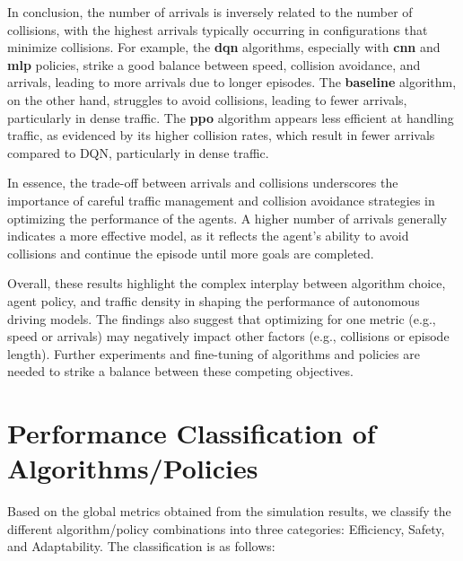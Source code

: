 In conclusion, the number of arrivals is inversely related to the number of collisions, with the highest arrivals typically occurring in configurations that minimize collisions. For example, the \textbf{dqn} algorithms, especially with \textbf{cnn} and \textbf{mlp} policies, strike a good balance between speed, collision avoidance, and arrivals, leading to more arrivals due to longer episodes. The \textbf{baseline} algorithm, on the other hand, struggles to avoid collisions, leading to fewer arrivals, particularly in dense traffic. The \textbf{ppo} algorithm appears less efficient at handling traffic, as evidenced by its higher collision rates, which result in fewer arrivals compared to DQN, particularly in dense traffic.

In essence, the trade-off between arrivals and collisions underscores the importance of careful traffic management and collision avoidance strategies in optimizing the performance of the agents. A higher number of arrivals generally indicates a more effective model, as it reflects the agent's ability to avoid collisions and continue the episode until more goals are completed.

Overall, these results highlight the complex interplay between algorithm choice, agent policy, and traffic density in shaping the performance of autonomous driving models. The findings also suggest that optimizing for one metric (e.g., speed or arrivals) may negatively impact other factors (e.g., collisions or episode length). 
Further experiments and fine-tuning of algorithms and policies are needed to strike a balance between these competing objectives.

\newpage


\section{Performance Classification of Algorithms/Policies}

Based on the global metrics obtained from the simulation results, we classify the different algorithm/policy combinations into three categories: Efficiency, Safety, and Adaptability. The classification is as follows:

